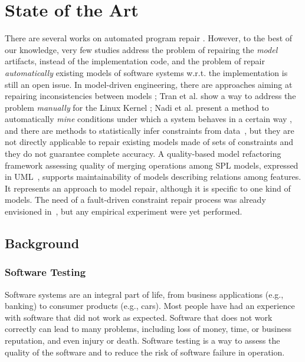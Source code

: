 \documentclass [a4paper, 12pt, twoside]{report}
\theoremstyle{plain}
\theoremstyle{definition}
\theoremstyle{remark}
\theoremstyle{plain}
\theoremstyle{plain}
\theoremstyle{remark}
\begin{document}
\part{State of the Art}
There are several works on automated program repair \cite{Nguyen_2013,le_goues_systematic_2012,ARCURI20113494}. However, to the best of our knowledge, very few studies address the problem of repairing the \textit{model} artifacts, instead of the implementation code, and the problem of repair \textit{automatically} existing models of software systems w.r.t. the implementation is still an open issue. 
In model-driven engineering, there are approaches aiming at repairing inconsistencies between models \cite{Macedo_2013}; Tran et al. show a way to address the problem \textit{manually} for the Linux Kernel \cite{Tran:1999:FRR:781995.782007}; Nadi et al. present a method to automatically \textit{mine} conditions under which a system behaves in a certain way \cite{NadiBKC14}, and there are methods to statistically infer constraints from data~\cite{chiang_unified_2011,Abukwaik_2016}, but they are not directly applicable to repair existing models made of sets of constraints and they do not guarantee complete accuracy. 
A quality-based model refactoring framework assessing quality of merging operations among SPL models, expressed in UML~\cite{rubin_quality_2013}, supports maintainability of models describing relations among features. It represents an approach to model repair, although it is specific to one kind of models.
The need of a fault-driven constraint repair process was already envisioned in~\cite{henard_towards_2013}, but any empirical experiment were yet performed.

\chapter{Background}

\section{Software Testing}
Software systems are an integral part of life, from business applications (e.g., banking) to consumer
products (e.g., cars). Most people have had an experience with software that did not work as expected.
Software that does not work correctly can lead to many problems, including loss of money, time, or
business reputation, and even injury or death. Software testing is a way to assess the quality of the
software and to reduce the risk of software failure in operation.
\end{document}
